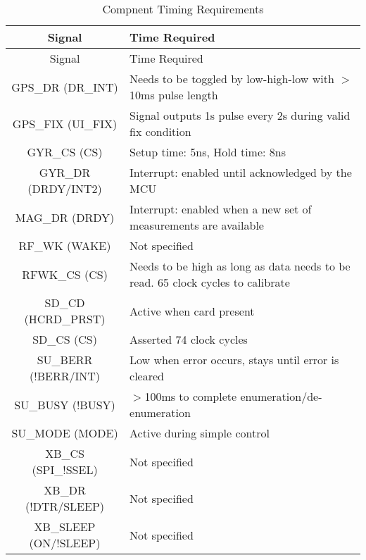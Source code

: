 \begin{center}
    \begin{longtable}{|c|p{3in}|}
    \caption{Compnent Timing Requirements  \label{tab:timeReqs}} \\
     \hline
    \rowcolor{Gray}
   Signal  & Time Required \\
    \hline \hline \endfirsthead
    
         \hline
    \rowcolor{Gray}
    Signal  & Time Required \\
    \hline \hline \endhead
    
    \endfoot

    GPS\_DR (DR\_INT) & Needs to be toggled by low-high-low with $>$10ms pulse length \\ \hline
    GPS\_FIX (UI\_FIX) & Signal outputs 1s pulse every 2s during valid fix condition \\ \hline
    GYR\_CS (CS) & Setup time: 5ns, Hold time: 8ns \\ \hline
    GYR\_DR (DRDY/INT2) & Interrupt: enabled until acknowledged by the MCU \\ \hline
    MAG\_DR (DRDY) & Interrupt: enabled when a new set of measurements are available \\ \hline
    RF\_WK (WAKE) & Not specified \\ \hline
    RFWK\_CS (CS) & Needs to be high as long as data needs to be read. 65 clock cycles to calibrate \\ \hline
    SD\_CD (HCRD\_PRST) & Active when card present \\ \hline
    SD\_CS (CS) & Asserted 74 clock cycles \\ \hline
    SU\_BERR (!BERR/INT) & Low when error occurs, stays until error is cleared \\ \hline
    SU\_BUSY (!BUSY) & $>$100ms to complete enumeration/de-enumeration \\ \hline
    SU\_MODE (MODE) & Active during simple control \\ \hline
    XB\_CS (SPI\_!SSEL) & Not specified \\ \hline
    XB\_DR (!DTR/SLEEP) & Not specified \\ \hline
    XB\_SLEEP (ON/!SLEEP) & Not specified \\ \hline
    \end{longtable}%

\end{center}%
  \vspace{-2cm}
  

